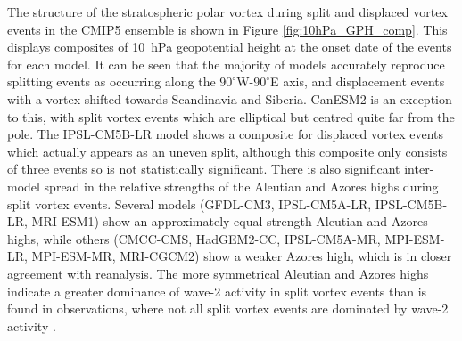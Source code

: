 The structure of the stratospheric polar vortex during split and displaced
vortex events in the CMIP5 ensemble is shown in Figure
\ref{fig:10hPa_GPH_comp}. This displays composites of 10~hPa geopotential height
at the onset date of the events for each model. It can be seen that the majority
of models accurately reproduce splitting events as occurring along the
$90^{\circ}$W-$90^{\circ}$E axis, and displacement events with a vortex shifted
towards Scandinavia and Siberia. CanESM2 is an exception to this, with split
vortex events which are elliptical but centred quite far from the pole. The
IPSL-CM5B-LR model shows a composite for displaced vortex events which actually
appears as an uneven split, although this composite only consists of three
events so is not statistically significant. There is also significant
inter-model spread in the relative strengths of the Aleutian and Azores highs
during split vortex events. Several models (GFDL-CM3, IPSL-CM5A-LR,
IPSL-CM5B-LR, MRI-ESM1) show an approximately equal strength Aleutian and Azores
highs, while others (CMCC-CMS, HadGEM2-CC, IPSL-CM5A-MR, MPI-ESM-LR, MPI-ESM-MR,
MRI-CGCM2) show a weaker Azores high, which is in closer agreement with
reanalysis. The more symmetrical Aleutian and Azores highs indicate a greater
dominance of wave-2 activity in split vortex events than is found in
observations, where not all split vortex events are dominated by wave-2 activity
\citep{Waugh1997,Mitchell2013}.

